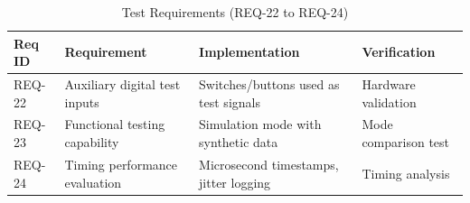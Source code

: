 \begin{table}[h!]
    \centering
    \label{tab:test_traceability}
    \small
    \begin{tabularx}{\linewidth}{|l|X|X|l|}
        \hline
        \textbf{Req ID} & \textbf{Requirement} & \textbf{Implementation} & \textbf{Verification} \\
        \hline
        REQ-22 & Auxiliary digital test inputs      & Switches/buttons used as test signals          & Hardware validation   \\
        \hline
        REQ-23 & Functional testing capability      & Simulation mode with synthetic data            & Mode comparison test  \\
        \hline
        REQ-24 & Timing performance evaluation      & Microsecond timestamps, jitter logging         & Timing analysis       \\
        \hline
    \end{tabularx}
    \caption{Test Requirements (REQ-22 to REQ-24)}
\end{table}


